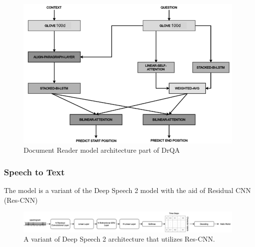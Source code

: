 \begin{figure}[!t]
    \centering
    \includegraphics[width=\linewidth]{img/DrQA.png}
    \caption{Document Reader model architecture part of DrQA \cite{DrQA}}
    \label{fig:DrQA}
\end{figure}





\subsubsection{Speech to Text}

The model is a variant of the Deep Speech 2 model with the aid of Residual CNN (Res-CNN)


\begin{figure}[!t]
    \centering
    \includegraphics[width=\linewidth]{img/speech.png}
    \caption{A variant of Deep Speech 2 architecture that utilizes Res-CNN.}
    \label{fig:deepSpeech}
    \vspace{-10pt}
\end{figure}

